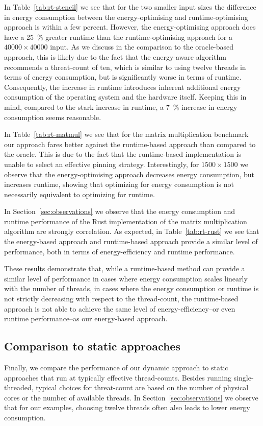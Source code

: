 \documentclass[runningheads]{llncs}
\begin{document}
In Table~\ref{tab:rt-stencil} we see that for the two smaller input sizes the difference in energy consumption between the energy-optimising and runtime-optimising approach is within a few percent.
However, the energy-optimising approach does have a \qty{25}{\percent} greater runtime than the runtime-optimising approach for a $40000 \times 40000$ input.
As we discuss in the comparison to the oracle-based approach, this is likely due to the fact that the energy-aware algorithm recommends a threat-count of ten, which is similar to using twelve threads in terms of energy consumption, but is significantly worse in terms of runtime.
Consequently, the increase in runtime introduces inherent additional energy consumption of the operating system and the hardware itself.
Keeping this in mind, compared to the stark increase in runtime, a \qty{7}{\percent} increase in energy consumption seems reasonable.

In Table~\ref{tab:rt-matmul} we see that for the matrix multiplication benchmark our approach fares better against the runtime-based approach than compared to the oracle.
This is due to the fact that the runtime-based implementation is unable to select an effective pinning strategy.
Interestingly, for $1500 \times 1500$ we observe that the energy-optimising approach decreases energy consumption, but increases runtime, showing that optimizing for energy consumption is not necessarily equivalent to optimizing for runtime.

In Section~\ref{sec:observations} we observe that the energy consumption and runtime performance of the Rust implementation of the matrix multiplication algorithm are strongly correlation.
As expected, in Table~\ref{tab:rt-rust} we see that the energy-based approach and runtime-based approach provide a similar level of performance, both in terms of energy-efficiency and runtime performance.

These results demonstrate that, while a runtime-based method can provide a similar level of performance in cases where energy consumption scales linearly with the number of threads, in cases where the energy consumption or runtime is not strictly decreasing with respect to the thread-count, the runtime-based approach is not able to achieve the same level of energy-efficiency--or even runtime performance--as our energy-based approach.

\subsection{Comparison to static approaches}\label{sec:evaluation-static}
Finally, we compare the performance of our dynamic approach to static approaches that run at typically effective thread-counts.
Besides running single-threaded, typical choices for threat-count are based on the number of physical cores or the number of available threads.
In Section~\ref{sec:observations} we observe that for our examples, choosing twelve threads often also leads to lower energy consumption.
\end{document}
